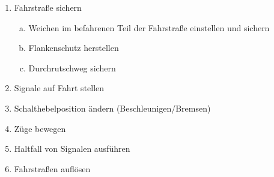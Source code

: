 

\begin{enumerate}
  \item Fahrstraße sichern
    \begin{enumerate}[a)]
      \item Weichen im befahrenen Teil der Fahrstraße einstellen und sichern
      \item Flankenschutz herstellen
      \item Durchrutschweg sichern
    \end{enumerate}
  \item Signale auf Fahrt stellen
  \item Schalthebelposition ändern (Beschleunigen/Bremsen)
  \item Züge bewegen
  \item Haltfall von Signalen ausführen
  \item Fahrstraßen auflösen
\end{enumerate}

